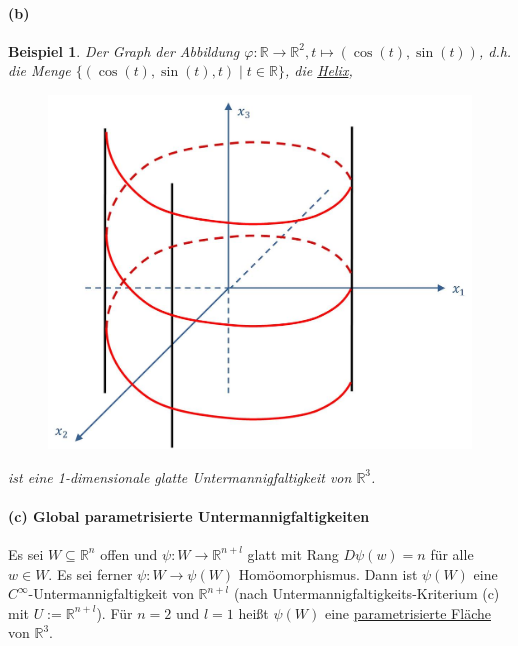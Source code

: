 \documentclass[a4paper,11pt,notitlepage]{report}
\newtheorem{example}{Beispiel}[chapter]
\newcommand{\R}{{\ensuremath{\mathbb{R}}}}
\begin{document}
\paragraph{(b)}
\begin{example}
	Der Graph der Abbildung $\varphi \colon \R \rightarrow \R^2, t \mapsto (\cos{(t)},\sin{(t)})$, d.h. die Menge $\{(\cos{(t)},\sin{(t)},t) \mid t \in \R\}$, die \underline{Helix},
\begin{figure}[h]
	\centering
	\includegraphics[scale=0.4]{images/Helix.jpg}
\end{figure}
 ist eine 1-dimensionale glatte Untermannigfaltigkeit von $\R^3$.
\end{example}

\paragraph{(c) Global parametrisierte Untermannigfaltigkeiten}
Es sei $W \subseteq \R^n$ offen und $\psi \colon W \rightarrow \R^{n+l}$ glatt mit Rang $D\psi(w)=n$ für alle $w \in W$. Es sei ferner $\psi \colon W \rightarrow \psi(W)$ Homöomorphismus.
Dann ist $\psi(W)$ eine $C^\infty$-Untermannigfaltigkeit von $\R^{n+l}$ (nach Untermannigfaltigkeits-Kriterium (c) mit $U := \R^{n+l}$).
\newline
Für $n=2$ und $l=1$ heißt $\psi(W)$ eine \underline{parametrisierte Fläche} von $\R^3$.
\end{document}
